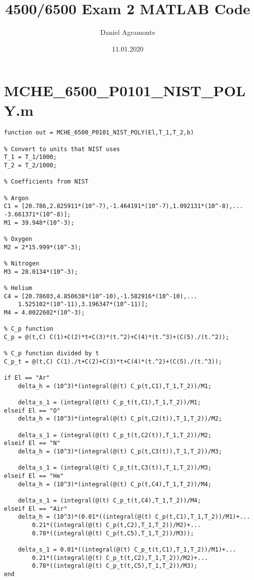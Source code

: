 \documentclass{article}
\title{4500/6500 Exam 2 MATLAB Code}
\author{Daniel Agramonte}
\date{11.01.2020}
\begin{document}
\maketitle

\section*{MCHE\_6500\_P0101\_NIST\_POLY.m}
\begin{lstlisting}[style=Matlab-editor]
function out = MCHE_6500_P0101_NIST_POLY(El,T_1,T_2,b)

% Convert to units that NIST uses
T_1 = T_1/1000;
T_2 = T_2/1000;

% Coefficients from NIST

% Argon
C1 = [20.786,2.825911*(10^-7),-1.464191*(10^-7),1.092131*(10^-8),...
-3.661371*(10^-8)];
M1 = 39.948*(10^-3);

% Oxygen
M2 = 2*15.999*(10^-3);

% Nitrogen
M3 = 28.0134*(10^-3);

% Helium
C4 = [20.78603,4.850638*(10^-10),-1.582916*(10^-10),...
    1.525102*(10^-11),3.196347*(10^-11)];
M4 = 4.0022602*(10^-3);

% C_p function
C_p = @(t,C) C(1)+C(2)*t+C(3)*(t.^2)+C(4)*(t.^3)+(C(5)./(t.^2)); 

% C_p function divided by t
C_p_t = @(t,C) C(1)./t+C(2)+C(3)*t+C(4)*(t.^2)+(C(5)./(t.^3));

if El == "Ar"
    delta_h = (10^3)*(integral(@(t) C_p(t,C1),T_1,T_2))/M1;

    delta_s_1 = (integral(@(t) C_p_t(t,C1),T_1,T_2))/M1;
elseif El == "O"
    delta_h = (10^3)*(integral(@(t) C_p(t,C2(t)),T_1,T_2))/M2;

    delta_s_1 = (integral(@(t) C_p_t(t,C2(t)),T_1,T_2))/M2;
elseif El == "N"
    delta_h = (10^3)*(integral(@(t) C_p(t,C3(t)),T_1,T_2))/M3;

    delta_s_1 = (integral(@(t) C_p_t(t,C3(t)),T_1,T_2))/M3;
elseif El == "He"
    delta_h = (10^3)*(integral(@(t) C_p(t,C4),T_1,T_2))/M4;

    delta_s_1 = (integral(@(t) C_p_t(t,C4),T_1,T_2))/M4;
elseif El == "Air"
    delta_h = (10^3)*(0.01*((integral(@(t) C_p(t,C1),T_1,T_2))/M1)+...
        0.21*((integral(@(t) C_p(t,C2),T_1,T_2))/M2)+...
        0.78*((integral(@(t) C_p(t,C5),T_1,T_2))/M3));

    delta_s_1 = 0.01*((integral(@(t) C_p_t(t,C1),T_1,T_2))/M1)+...
        0.21*((integral(@(t) C_p_t(t,C2),T_1,T_2))/M2)+...
        0.78*((integral(@(t) C_p_t(t,C5),T_1,T_2))/M3);
end


\end{lstlisting}
\end{document}
